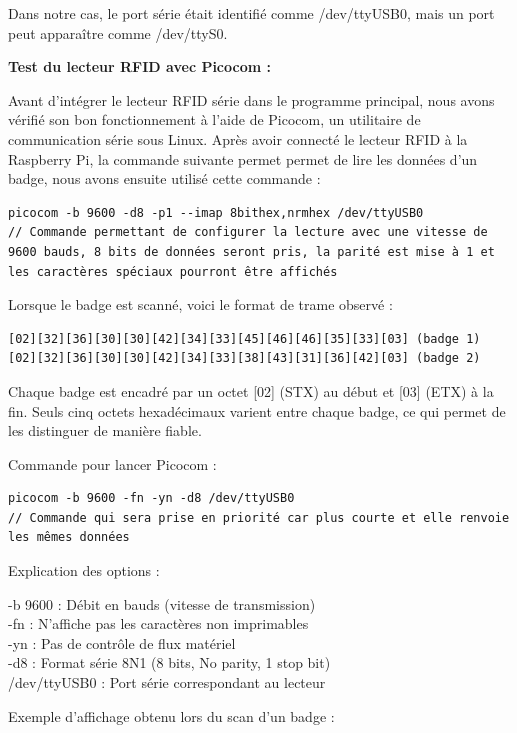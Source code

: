 \documentclass[main.tex]{subfiles}
\begin{document}
Dans notre cas, le port série était identifié comme /dev/ttyUSB0, mais un port peut apparaître comme /dev/ttyS0.

\textbf{Test du lecteur RFID avec Picocom :}

Avant d’intégrer le lecteur RFID série dans le programme principal, nous avons vérifié son bon fonctionnement à l’aide de Picocom, un utilitaire de communication série sous Linux. Après avoir connecté le lecteur RFID à la Raspberry Pi, la commande suivante permet permet de lire les données d’un badge, nous avons ensuite utilisé cette commande :

\begin{lstlisting}
picocom -b 9600 -d8 -p1 --imap 8bithex,nrmhex /dev/ttyUSB0
// Commande permettant de configurer la lecture avec une vitesse de 9600 bauds, 8 bits de données seront pris, la parité est mise à 1 et les caractères spéciaux pourront être affichés
\end{lstlisting}

Lorsque le badge est scanné, voici le format de trame observé :

\begin{lstlisting}
[02][32][36][30][30][42][34][33][45][46][46][35][33][03] (badge 1) 
[02][32][36][30][30][42][34][33][38][43][31][36][42][03] (badge 2)
\end{lstlisting}

Chaque badge est encadré par un octet [02] (STX) au début et [03] (ETX) à la fin. Seuls cinq octets hexadécimaux varient entre chaque badge, ce qui permet de les distinguer de manière fiable.

Commande pour lancer Picocom :

\begin{lstlisting}
picocom -b 9600 -fn -yn -d8 /dev/ttyUSB0
// Commande qui sera prise en priorité car plus courte et elle renvoie les mêmes données 
\end{lstlisting}

Explication des options :

-b 9600 : Débit en bauds (vitesse de transmission) \\
-fn : N'affiche pas les caractères non imprimables \\
-yn : Pas de contrôle de flux matériel \\
-d8 : Format série 8N1 (8 bits, No parity, 1 stop bit) \\
/dev/ttyUSB0 : Port série correspondant au lecteur

Exemple d’affichage obtenu lors du scan d’un badge :
\end{document}
